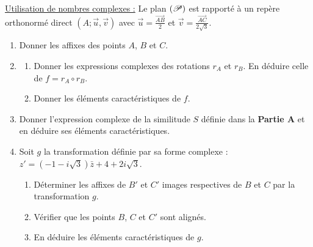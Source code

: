 \begin{description}
\begin{enumerate}
\begin{enumerate}
                              \end{enumerate}
                  \end{enumerate}
            \item[Partie B :] \underline{Utilisation de nombres complexes :} \newline
                  Le plan $(\mathscr{P})$ est rapport\'e \`a un rep\`ere orthonorm\'e direct $(A ; \vec{u} , \vec{v} )$ avec
                  $\vec{u} = \frac{\overrightarrow{AB}}{2}$ et $\vec{v} = \frac{\overrightarrow{AC}}{2 \sqrt{3}}$.
                  \begin{enumerate}
                        \item Donner les affixes des points $A$, $B$ et $C$.
                        \item \begin{enumerate}
                                    \item Donner les expressions complexes des rotations $r_A$ et $r_B$.
                                          En d\'eduire celle de $f = r_A \circ r_B$.
                                    \item Donner les \'el\'ements caract\'eristiques de $f$.
                              \end{enumerate}
                        \item Donner l'expression complexe de la similitude $S$ d\'efinie dans la 
                              \textbf{Partie A} et en d\'eduire ses \'el\'ements caract\'eristiques.
                        \item Soit $g$ la transformation d\'efinie par sa forme complexe : 
                              $z' = \left( -1-i\sqrt{3} \right) \bar{z} + 4 + 2 i \sqrt{3}$.
                              \begin{enumerate}
                                    \item D\'eterminer les affixes de $B'$ et $C'$ images respectives de $B$ et $C$ par 
                                          la transformation $g$.
                                    \item V\'erifier que les points $B$, $C$ et $C'$ sont align\'es.
                                    \item En d\'eduire les \'el\'ements caract\'eristiques de $g$.
                              \end{enumerate}
                  \end{enumerate}
      \end{description}
